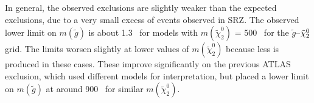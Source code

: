 In general, the observed exclusions are slightly weaker than the expected exclusions, due to a very small excess of events observed in SRZ. The observed lower limit on $m(\tilde{g})$ is about 1.3 \tev~for models with $m(\tilde{\chi}^{0}_{2})$ = 500 \gev~for the $\tilde{g}$--$\tilde{\chi}_2^0$ grid. The limits worsen slightly at lower values of $m(\tilde{\chi}^{0}_{2})$ because less \met is produced in these cases. These improve significantly on the previous \ac{ATLAS} exclusion, which used different models for interpretation, but placed a lower limit on $m(\tilde{g})$ at around 900 \gev~for similar $m(\tilde{\chi}^{0}_{2})$. 



